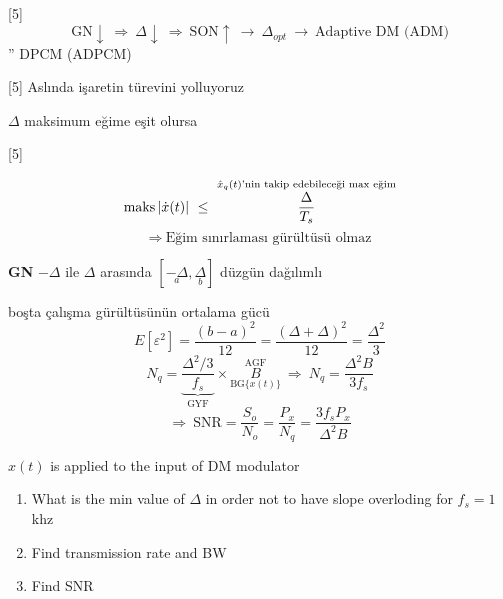 \documentclass[11pt,a4paper]{article}
\begin{document}
[5]
\[ \mathrm{GN}\downarrow\ \Rightarrow\ \Delta\downarrow\ \Rightarrow\ \mathrm{SON}\uparrow\ \rightarrow\ \Delta_{opt}\ \rightarrow\ \text{Adaptive DM (ADM)} \]
\hspace*{8.2cm}'' DPCM (ADPCM)

[5]
Aslında işaretin türevini yolluyoruz

$\Delta$ maksimum eğime eşit olursa

[5]

\[ \mathrm{maks}\,|\dot{x}(t)|\ \le\ \overset{\text{\scriptsize $\hat{x}_q(t)$'nin takip edebileceği max eğim}}{\frac{\Delta}{T_s}} \]
\[ \Rightarrow\ \text{Eğim sınırlaması gürültüsü olmaz} \]

\textbf{GN} \quad $-\Delta$ ile $\Delta$ arasında $[\underset{a}{-\Delta},\underset{b}{\Delta}]$ düzgün dağılımlı

boşta çalışma gürültüsünün ortalama gücü
\[ E[\varepsilon^2]=\frac{(b-a)^2}{12}=\frac{(\Delta+\Delta)^2}{12}=\frac{\Delta^2}{3} \]
\[ N_q=\underbrace{\frac{\Delta^2/3}{f_s}}_{\text{GYF}}\times \overset{\text{AGF}}{\underset{\mathrm{BG}\{x(t)\}}{B}}\ \Rightarrow\ N_q=\frac{\Delta^2 B}{3f_s} \]
\[ \Rightarrow\ \mathrm{SNR}=\frac{S_o}{N_o}=\frac{P_x}{N_q}=\frac{3f_sP_x}{\Delta^2B} \]

\begin{ornek}
$x(t)$ is applied to the input of DM modulator
\begin{enumerate}[label=\alph*)]
\item What is the min value of $\Delta$ in order not to have slope overloding for $f_s=1$ khz
\item Find transmission rate and BW
\item Find SNR
\end{enumerate}
\end{ornek}

\begin{center}
\end{center}
\end{document}
